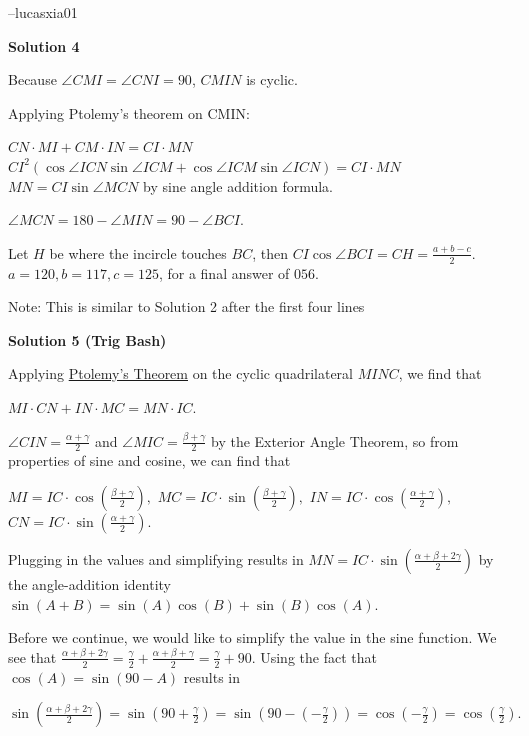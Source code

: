 \begin{enumerate}
 --lucasxia01

 



\textbf{Solution 4}

Because $\angle CMI = \angle CNI = 90$, $CMIN$ is cyclic. 

 Applying Ptolemy's theorem on CMIN:

 $CN \cdot MI+CM \cdot IN=CI \cdot MN$
$CI^2(\cos \angle ICN \sin \angle ICM + \cos \angle ICM \sin \angle ICN) = CI \cdot MN$
$MN = CI \sin \angle MCN$ by sine angle addition formula.

 $\angle MCN = 180 - \angle MIN = 90 - \angle BCI$. 

 Let $H$ be where the incircle touches $BC$, then $CI \cos \angle BCI = CH = \frac{a+b-c}{2}$.$a=120, b=117, c=125$, for a final answer of $\boxed{056}$.

 Note: This is similar to Solution 2 after the first four lines

 



\textbf{Solution 5 (Trig Bash)}

Applying \href{https://artofproblemsolving.com/wiki/index.php?title=Ptolemy\%27s\_Theorem}{Ptolemy's Theorem} on the cyclic quadrilateral $MINC$, we find that

 $MI\cdot CN + IN\cdot MC = MN\cdot IC$.

 $\angle CIN=\frac{\alpha+\gamma}{2}$ and $\angle MIC=\frac{\beta+\gamma}{2}$ by the Exterior Angle Theorem, so from properties of sine and cosine, we can find that

 $MI=IC\cdot\cos\left(\frac{\beta+\gamma}{2}\right),$ $MC=IC\cdot\sin\left(\frac{\beta+\gamma}{2}\right),$ $IN=IC\cdot\cos\left(\frac{\alpha+\gamma}{2}\right),$ $CN=IC\cdot\sin\left(\frac{\alpha+\gamma}{2}\right).$

 Plugging in the values and simplifying results in $MN = IC\cdot\sin\left(\frac{\alpha+\beta+2\gamma}{2}\right)$ by the angle-addition identity $\sin(A+B)=\sin(A)\cos(B)+\sin(B)\cos(A)$.

 Before we continue, we would like to simplify the value in the sine function. We see that $\frac{\alpha+\beta+2\gamma}{2}=\frac{\gamma}{2}+\frac{\alpha+\beta+\gamma}{2}=\frac{\gamma}{2}+90$. Using the fact that $\cos(A)=\sin(90-A)$ results in

 $\sin\left(\frac{\alpha+\beta+2\gamma}{2}\right)=\sin\left(90+\frac{\gamma}{2}\right)=\sin\left(90-(-\frac{\gamma}{2})\right)=\cos\left(-\frac{\gamma}{2}\right)=\cos\left(\frac{\gamma}{2}\right).$


\end{enumerate}
